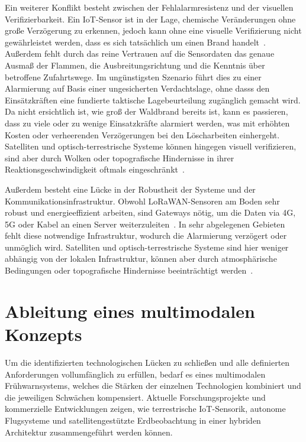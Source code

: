 Ein weiterer Konflikt besteht zwischen der Fehlalarmresistenz und der visuellen Verifizierbarkeit. Ein \acs{IoT}-Sensor ist in der Lage, chemische Veränderungen ohne große Verzögerung zu erkennen, jedoch kann ohne eine visuelle Verifizierung nicht gewährleistet werden, dass es sich tatsächlich um einen Brand handelt~\cite{Kumar2023}. Außerdem fehlt durch das reine Vertrauen auf die Sensordaten das genaue Ausmaß der Flammen, die Ausbreitungsrichtung und die Kenntnis über betroffene Zufahrtswege. Im ungünstigsten Szenario führt dies zu einer Alarmierung auf Basis einer ungesicherten Verdachtslage, ohne dasss den Einsätzkräften eine fundierte taktische Lagebeurteilung zugänglich gemacht wird. Da nicht ersichtlich ist, wie groß der Waldbrand bereits ist, kann es passieren, dass zu viele oder zu wenige Einsatzkräfte alarmiert werden, was mit erhöhten Kosten oder verheerenden Verzögerungen bei den Löscharbeiten einhergeht. Satelliten und optisch-terrestrische Systeme können hingegen visuell verifizieren, sind aber durch Wolken oder topografische Hindernisse in ihrer Reaktionsgeschwindigkeit oftmals eingeschränkt~\cite{Bernhard2010}.

Außerdem besteht eine Lücke in der Robustheit der Systeme und der Kommunikationsinfrastruktur. Obwohl \acs{LoRaWAN}-Sensoren am Boden sehr robust und energieeffizient arbeiten, sind Gateways nötig, um die Daten via 4G, 5G oder Kabel an einen Server weiterzuleiten~\cite{Nodes.sh2024}. In sehr abgelegenen Gebieten fehlt diese notwendige Infrastruktur, wodurch die Alarmierung verzögert oder unmöglich wird. Satelliten und optisch-terrestrische Systeme sind hier weniger abhängig von der lokalen Infrastruktur, können aber durch atmosphärische Bedingungen oder topografische Hindernisse beeinträchtigt werden~\cite{VIIRSLexikon}.

\chapter{Ableitung eines multimodalen Konzepts}\label{ch:ableitungmultimodalenKonzep}

Um die identifizierten technologischen Lücken zu schließen und alle definierten Anforderungen vollumfänglich zu erfüllen, bedarf es eines multimodalen Frühwarnsystems, welches die Stärken der einzelnen Technologien kombiniert und die jeweiligen Schwächen kompensiert. Aktuelle Forschungsprojekte und kommerzielle Entwicklungen zeigen, wie terrestrische \acs{IoT}-Sensorik, autonome Flugsysteme und satellitengestützte Erdbeobachtung in einer hybriden Architektur zusammengeführt werden können.


